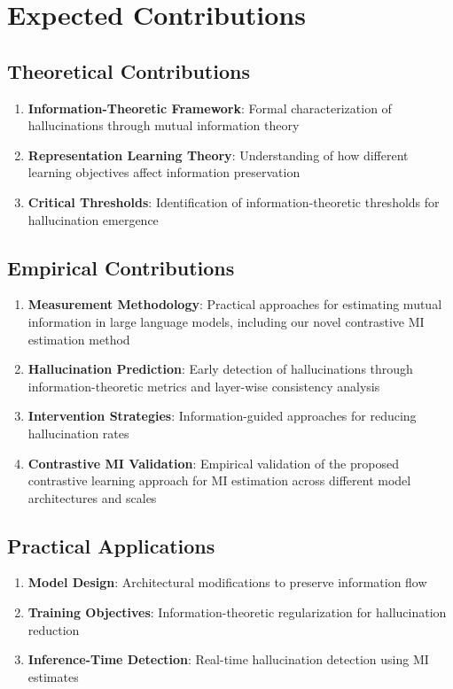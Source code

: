 \section{Expected Contributions}
\label{sec:contributions}

\subsection{Theoretical Contributions}
\begin{enumerate}
    \item \textbf{Information-Theoretic Framework}: Formal characterization of hallucinations through mutual information theory
    \item \textbf{Representation Learning Theory}: Understanding of how different learning objectives affect information preservation
    \item \textbf{Critical Thresholds}: Identification of information-theoretic thresholds for hallucination emergence
\end{enumerate}

\subsection{Empirical Contributions}
\begin{enumerate}
    \item \textbf{Measurement Methodology}: Practical approaches for estimating mutual information in large language models, including our novel contrastive MI estimation method
    \item \textbf{Hallucination Prediction}: Early detection of hallucinations through information-theoretic metrics and layer-wise consistency analysis
    \item \textbf{Intervention Strategies}: Information-guided approaches for reducing hallucination rates
    \item \textbf{Contrastive MI Validation}: Empirical validation of the proposed contrastive learning approach for MI estimation across different model architectures and scales
\end{enumerate}

\subsection{Practical Applications}
\begin{enumerate}
    \item \textbf{Model Design}: Architectural modifications to preserve information flow
    \item \textbf{Training Objectives}: Information-theoretic regularization for hallucination reduction
    \item \textbf{Inference-Time Detection}: Real-time hallucination detection using MI estimates
\end{enumerate}

